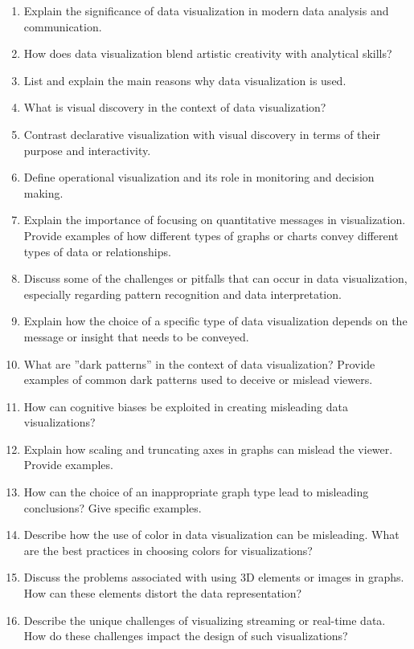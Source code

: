 \begin{enumerate}[nosep]
    \item Explain the significance of data visualization in modern data analysis and communication.
    \item How does data visualization blend artistic creativity with analytical skills?
    \item List and explain the main reasons why data visualization is used.
    \item What is visual discovery in the context of data visualization?
    \item Contrast declarative visualization with visual discovery in terms of their purpose and interactivity.
    \item Define operational visualization and its role in monitoring and decision making.
    \item Explain the importance of focusing on quantitative messages in visualization. Provide examples of how different types of graphs or charts convey different types of data or relationships.
    \item Discuss some of the challenges or pitfalls that can occur in data visualization, especially regarding pattern recognition and data interpretation.
    \item Explain how the choice of a specific type of data visualization depends on the message or insight that needs to be conveyed.
    \item What are ''dark patterns'' in the context of data visualization? Provide examples of common dark patterns used to deceive or mislead viewers.
    \item How can cognitive biases be exploited in creating misleading data visualizations?
    \item Explain how scaling and truncating axes in graphs can mislead the viewer. Provide examples.
    \item How can the choice of an inappropriate graph type lead to misleading conclusions? Give specific examples.
    \item Describe how the use of color in data visualization can be misleading. What are the best practices in choosing colors for visualizations?
    \item Discuss the problems associated with using 3D elements or images in graphs. How can these elements distort the data representation?
    \item Describe the unique challenges of visualizing streaming or real-time data. How do these challenges impact the design of such visualizations?

\end{enumerate}

